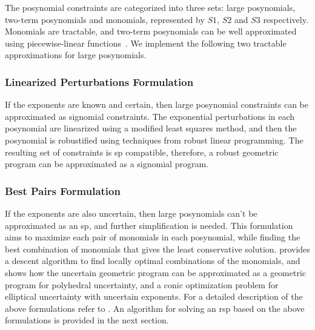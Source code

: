 The posynomial constraints are categorized into three sets: large posynomials, two-term posynomials and monomials,
represented by $S1$, $S2$ and $S3$ respectively.
Monomials are tractable, and two-term posynomials can be well approximated using piecewise-linear
functions~\cite{hsiung_kim_boyd_2007}.
We implement the following two tractable approximations for large posynomials.

\subsubsection{Linearized Perturbations Formulation}
If the exponents are known and certain, then large posynomial constraints can be approximated as signomial constraints.
The exponential perturbations in each posynomial are linearized using a modified least squares method, and then the
posynomial is robustified using techniques from robust linear programming. The resulting set of constraints is \gls{sp} compatible,
therefore, a robust geometric program can be approximated as a signomial program.

\subsubsection{Best Pairs Formulation}
If the exponents are also uncertain, then large posynomials can't be approximated as an \gls{sp}, and further simplification is needed.
This formulation aims to maximize each pair of monomials in each posynomial,
while finding the best combination of monomials that gives the least conservative solution.
\cite{Saab2018} provides a descent algorithm to find locally optimal combinations of the monomials,
and shows how the uncertain geometric program can be approximated as a geometric program for polyhedral uncertainty,
and a conic optimization problem for elliptical uncertainty with uncertain exponents.
For a detailed description of the above formulations refer to \cite{Saab2018}.
An algorithm for solving an \gls{rsp} based on the above formulations is provided in the next section.
